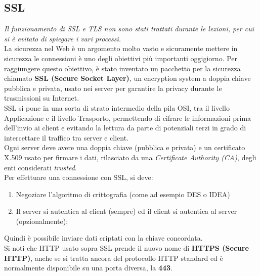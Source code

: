    \subsection{SSL}

        \emph{Il funzionamento di SSL e TLS non sono stati trattati durante le lezioni, per cui si è evitato di
        spiegare i vari processi.}\\

        La sicurezza nel Web è un argomento molto vasto e sicuramente mettere in sicurezza le
        connessioni è uno degli obiettivi più importanti oggigiorno. Per raggiungere questo obiettivo, è
        stato inventato un pacchetto per la sicurezza chiamato \textbf{SSL (Secure Socket Layer)}, un
        encryption system a doppia chiave pubblica e privata, usato nei server per garantire la privacy
        durante le trasmissioni su Internet.\\

        SSL si pone in una sorta di strato intermedio della pila OSI, tra il livello Applicazione e il livello
        Trasporto, permettendo di cifrare le informazioni prima dell’invio ai client e evitando la lettura
        da parte di potenziali terzi in grado di intercettare il traffico tra server e client.\\

        Ogni server deve avere una doppia chiave (pubblica e privata) e un certificato X.509 usato per
        firmare i dati, rilasciato da una \emph{Certificate Authority (CA)}, degli enti considerati \emph{trusted}.\\

        Per effettuare una connessione con SSL, si deve:

        \begin{enumerate}
            \item Negoziare l’algoritmo di crittografia (come ad esempio DES o IDEA)
            \item Il server si autentica al client (sempre) ed il client si autentica al server (opzionalmente);
        \end{enumerate}

        Quindi è possibile inviare dati criptati con la chiave concordata.\\

        Si noti che HTTP usato sopra SSL prende il nuovo nome di \textbf{HTTPS (Secure HTTP)}, anche se si
        tratta ancora del protocollo HTTP standard ed è normalmente disponibile su una porta diversa,
        la \textbf{443}.\\

